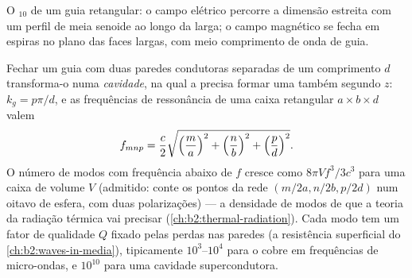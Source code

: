 \begin{omfigure}

{\small O $_{10}$ de um guia retangular: o campo elétrico
percorre a dimensão estreita com um perfil de meia senoide ao longo da
larga; o campo magnético se fecha em espiras no plano das faces
largas, com meio comprimento de onda de guia.}
\end{omfigure}

\begin{proposition}\label{prop:b2:guided-waves:cavity}
Fechar um guia com duas paredes condutoras separadas de um comprimento $d$ transforma-o
numa \emph{cavidade}, na qual a  precisa formar uma  também segundo $z$: $k_g = p\pi/d$, e as frequências de ressonância de uma
caixa retangular $a \times b \times d$ valem
\[
f_{mnp} = \frac c2\sqrt{\Bigl(\frac ma\Bigr)^2 + \Bigl(\frac nb\Bigr)^2 + \Bigl(\frac pd\Bigr)^2} .
\]
O número de modos com frequência abaixo de $f$ cresce como $8\pi V f^3/3c^3$ para
uma caixa de volume $V$ (admitido: conte os pontos da rede
$(m/2a, n/2b, p/2d)$ num oitavo de esfera, com duas polarizações)
--- a densidade de modos de que a teoria da radiação térmica vai
precisar (\cref{ch:b2:thermal-radiation}). Cada modo tem um fator de qualidade
$Q$ fixado pelas perdas nas paredes (a resistência superficial do
\cref{ch:b2:waves-in-media}), tipicamente $10^3$--$10^4$ para o cobre em
frequências de micro-ondas, e $10^{10}$ para uma cavidade supercondutora.
\end{proposition}

